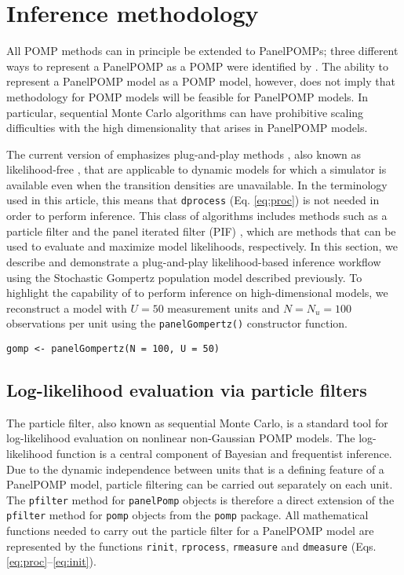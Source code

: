 \section{Inference methodology}\label{inference-methodology}

All POMP methods can in principle be extended to PanelPOMPs;
three different ways to represent a PanelPOMP as a POMP were identified by \citet{romero-severson15}.
The ability to represent a PanelPOMP model as a POMP model, however, does not imply that methodology for POMP models will be feasible for PanelPOMP models.
In particular, sequential Monte Carlo algorithms can have prohibitive scaling difficulties with the high dimensionality that arises in PanelPOMP models.

The current version of  emphasizes plug-and-play methods \citep{breto09, he10}, also known as likelihood-free \citep{marjoram03, sisson07}, that are applicable to dynamic models for which a simulator is available even when the transition densities are unavailable.
In the terminology used in this article, this means that \texttt{dprocess} (Eq. \eqref{eq:proc}) is not needed in order to perform inference.
This class of algorithms includes methods such as a particle filter \citep{arulampalam02} and the panel iterated filter (PIF) \citep{breto20}, which are methods that can be used to evaluate and maximize model likelihoods, respectively.
In this section, we describe and demonstrate a plug-and-play likelihood-based inference workflow using the Stochastic Gompertz population model described previously.
To highlight the capability of  to perform inference on high-dimensional models, we reconstruct a model with \(U = 50\) measurement units and \(N = N_u = 100\) observations per unit using the \texttt{panelGompertz()} constructor function.

\begin{verbatim}
gomp <- panelGompertz(N = 100, U = 50)
\end{verbatim}

\subsection{Log-likelihood evaluation via particle filters}\label{log-likelihood-evaluation-via-particle-filters}

The particle filter, also known as sequential Monte Carlo, is a standard tool for log-likelihood evaluation on nonlinear non-Gaussian POMP models.
The log-likelihood function is a central component of Bayesian and frequentist inference.
Due to the dynamic independence between units that is a defining feature of a PanelPOMP model, particle filtering can be carried out separately on each unit.
The \texttt{pfilter} method for \texttt{panelPomp} objects is therefore a direct extension of the \texttt{pfilter} method for \texttt{pomp} objects from the \texttt{pomp} package.
All mathematical functions needed to carry out the particle filter for a PanelPOMP model are represented by the functions \texttt{rinit}, \texttt{rprocess}, \texttt{rmeasure} and \texttt{dmeasure} (Eqs. \eqref{eq:proc}--\eqref{eq:init}).

